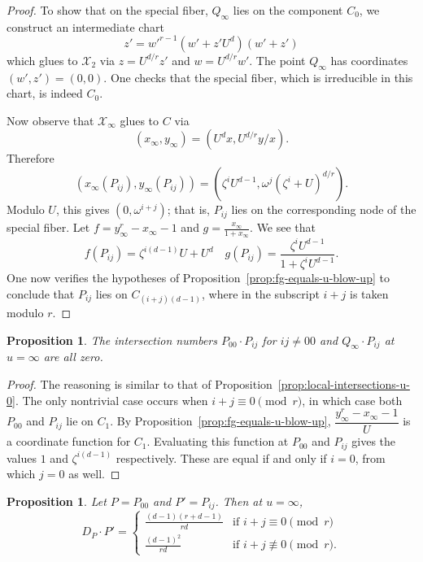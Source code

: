 \documentclass[reqno]{amsart}
\newtheorem{proposition}[thm]{Proposition}
\theoremstyle{definition}
\theoremstyle{remark}
\def\XX{\mathcal{X}}
\newcommand{\sxi}{\mathcal{X}_\infty}
\begin{document}
\begin{proof}
To show that on the special fiber, $Q_\infty$ lies on the component $C_0$, we construct an intermediate chart
  \[
  z' = w'^{r-1}(w'+z'U^d)(w'+z')
  \]
  which glues to $\XX_2$ via $z = U^{d/r} z'$ and $w = U^{d/r} w'$. The point $Q_\infty$ has coordinates $(w', z') = (0,0)$. One checks that the special fiber, which is irreducible in this chart, is indeed $C_0$.

  Now observe that $\sxi$ glues to $C$ via
  \[
  (x_\infty, y_\infty) = (U^d x, U^{d/r} y/x).
  \]
  Therefore
  \[
  (x_\infty(P_{ij}), y_\infty(P_{ij})) = (\zeta^i U^{d-1}, \omega^j (\zeta^i + U)^{d/r}).
  \]
  Modulo $U$, this gives $(0,\omega^{i+j})$; that is, $P_{ij}$ lies on the corresponding node of the special fiber. Let $f = y_\infty^r - x_\infty - 1$ and $g = \frac{x_\infty}{1+x_\infty}$. We see that 
  \[
  f(P_{ij}) = \zeta^{i(d-1)} U + U^d \quad g(P_{ij}) = \frac{\zeta^i U^{d-1}}{1 + \zeta^i U^{d-1}}.
  \]
  One now verifies the hypotheses of Proposition~\ref{prop:fg-equals-u-blow-up} to conclude that $P_{ij}$ lies on $C_{(i+j)(d-1)}$, where in the subscript $i+j$ is taken modulo $r$.
\end{proof}

\begin{proposition}\label{prop:local-intersections-u-infty}
  The intersection numbers $P_{00} \cdot P_{ij}$ for $ij \neq 00$ and $Q_{\infty} \cdot P_{ij}$ at $u = \infty$ are all zero.
\end{proposition}

\begin{proof}
  The reasoning is similar to that of Proposition~\ref{prop:local-intersections-u-0}. The only nontrivial case occurs when $i+j \equiv 0 \pmod{r}$, in which case both $P_{00}$ and $P_{ij}$ lie on $C_1$. By Proposition~\ref{prop:fg-equals-u-blow-up}, $\dfrac{y_\infty^r - x_\infty - 1}{U}$ is a coordinate function for $C_1$. Evaluating this function at $P_{00}$ and $P_{ij}$ gives the values $1$ and $\zeta^{i(d-1)}$ respectively. These are equal if and only if $i = 0$, from which $j = 0$ as well.
\end{proof}

\begin{proposition}\label{prop:dp-u-infty}
  Let $P = P_{00}$ and $P' = P_{ij}$. Then at $u = \infty$,
\[
D_P \cdot P' =
\begin{cases}
  \frac{(d-1)(r+d-1)}{rd} & \text{if } i+j \equiv 0 \pmod{r} \\
  \frac{(d-1)^2}{rd} & \text{if } i+j \not\equiv 0 \pmod{r}.
\end{cases}
\]
\end{proposition}
\end{document}
